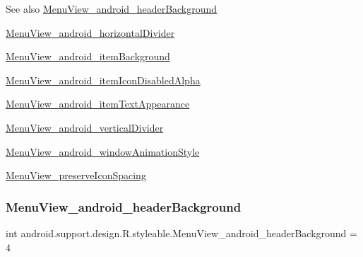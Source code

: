 \begin{DoxySeeAlso}{See also}
\hyperlink{classandroid_1_1support_1_1design_1_1R_1_1styleable_a38f013733be3380a35b5c18a342f420f}{Menu\+View\+\_\+android\+\_\+header\+Background} 

\hyperlink{classandroid_1_1support_1_1design_1_1R_1_1styleable_acd977854a2afdaf80b462337a6a55b96}{Menu\+View\+\_\+android\+\_\+horizontal\+Divider} 

\hyperlink{classandroid_1_1support_1_1design_1_1R_1_1styleable_a1ec0468c04c0d2612a6212d4448d2ad6}{Menu\+View\+\_\+android\+\_\+item\+Background} 

\hyperlink{classandroid_1_1support_1_1design_1_1R_1_1styleable_ad79c85741d32debefed2622b6ef2577f}{Menu\+View\+\_\+android\+\_\+item\+Icon\+Disabled\+Alpha} 

\hyperlink{classandroid_1_1support_1_1design_1_1R_1_1styleable_a116d9432d77aa3d62ec171b23d0bee4c}{Menu\+View\+\_\+android\+\_\+item\+Text\+Appearance} 

\hyperlink{classandroid_1_1support_1_1design_1_1R_1_1styleable_afadfabc8bd18f617b9220fe44a79d46f}{Menu\+View\+\_\+android\+\_\+vertical\+Divider} 

\hyperlink{classandroid_1_1support_1_1design_1_1R_1_1styleable_a4e2664155896bc2a2363684e68573525}{Menu\+View\+\_\+android\+\_\+window\+Animation\+Style} 

\hyperlink{classandroid_1_1support_1_1design_1_1R_1_1styleable_a95328f75cc0262ab91e2f350455b98bc}{Menu\+View\+\_\+preserve\+Icon\+Spacing} 
\end{DoxySeeAlso}
\mbox{\label{classandroid_1_1support_1_1design_1_1R_1_1styleable_a38f013733be3380a35b5c18a342f420f}} 
\subsubsection{\texorpdfstring{Menu\+View\+\_\+android\+\_\+header\+Background}{MenuView\_android\_headerBackground}}
{\footnotesize\ttfamily int android.\+support.\+design.\+R.\+styleable.\+Menu\+View\+\_\+android\+\_\+header\+Background = 4\hspace{0.3cm}{\ttfamily [static]}}

